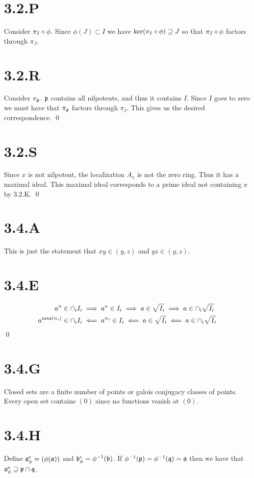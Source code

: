 \documentclass{article}
\begin{document}
\section{3.2.P}
Consider $\pi_I \circ \phi$. Since $\phi(J) \subset I$ we have $\ker(\pi_I \circ \phi) \supseteq J$ so that $\pi_I \circ \phi$ factors through $\pi_J$.

\section{3.2.R}
Consider $\pi_{\mathfrak{p}}$. $\mathfrak{p}$ contains all nilpotents, and thus it contains $I$. Since $I$ goes to zero we must have that $\pi_{\mathfrak{p}}$ factors through $\pi_I$.
This gives us the desired correspondence. \qed

\section{3.2.S}
Since $x$ is not nilpotent, the localization $A_x$ is not the zero ring. Thus it has a maximal ideal. This maximal ideal corresponds to a prime ideal not containing $x$ by 3.2.K. \qed

\section{3.4.A}
This is just the statement that $xy \in (y,z)$ and $yz \in (y, z)$.

\section{3.4.E}
\begin{align*}
    a^n           & \in \cap_i I_i \implies a^n \in I_i \implies a \in \sqrt{I_i} \implies a \in \cap_i \sqrt{I_i}           \\
    a^{\max(n_i)} & \in \cap_i I_i \impliedby a^{n_i} \in I_i \impliedby a \in \sqrt{I_i} \impliedby a \in \cap_i \sqrt{I_i}
\end{align*}
\qed

\section{3.4.G}
Closed sets are a finite number of points or galois conjugacy classes of points. Every open set contains $(0)$ since no functions vanish at $(0)$.

\section{3.4.H}
Define $\mathfrak{a}_{\phi}^{\text{e}}=(\phi(\mathfrak{a}))$ and $\mathfrak{b}_{\phi}^{\text{c}}=\phi^{-1}(\mathfrak{b})$. If $\phi^{-1}(\mathfrak{p})=\phi^{-1}(\mathfrak{q})=\mathfrak{a}$ then we have that $\mathfrak{a}_{\phi}^{\text{e}} \supseteq \mathfrak{p} \cap \mathfrak{q}$.
\end{document}
